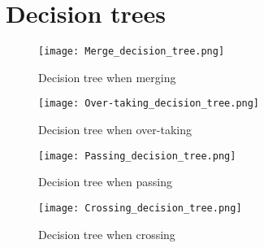 \chapter{Decision trees}
\label{app:decision-trees}


\begin{figure}[hp]
	\centering
	\texttt{[image: Merge\_decision\_tree.png]}
	\caption{Decision tree when merging}
	\label{fig:Merge_decision_tree}
\end{figure}


\begin{figure}[hp]
	\centering
	\texttt{[image: Over-taking\_decision\_tree.png]}
	\caption{Decision tree when over-taking}
	\label{fig:Over-taking_decision_tree}
\end{figure}


\begin{figure}[hp]
	\centering
	\texttt{[image: Passing\_decision\_tree.png]}
	\caption{Decision tree when passing}
	\label{fig:Passing_decision_tree}
\end{figure}

\begin{figure}[hp]
	\centering
	\texttt{[image: Crossing\_decision\_tree.png]}
	\caption{Decision tree when crossing}
	\label{fig:Crossing_decision_tree}
\end{figure}